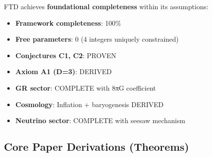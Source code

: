 \documentclass[
  11pt,
  letterpaper,
  twoside,
  openany]{book}
\makeatletter
\providecommand{\tightlist}{%
  \setlength{\itemsep}{0pt}\setlength{\parskip}{0pt}}
\let\orig@subsection\subsection
\renewcommand{\subsection}{\needspace{6\baselineskip}\orig@subsection}
\makeatother
\begin{document}
\begin{tcolorbox}[enhanced jigsaw, colbacktitle=quarto-callout-important-color!10!white, titlerule=0mm, bottomtitle=1mm, bottomrule=.15mm, colback=white, arc=.35mm, breakable, toprule=.15mm, title=\textcolor{quarto-callout-important-color}{\faExclamation}\hspace{0.5em}{Foundational Completeness Status}, rightrule=.15mm, coltitle=black, leftrule=.75mm, colframe=quarto-callout-important-color-frame, toptitle=1mm, opacityback=0, opacitybacktitle=0.6, left=2mm]

FTD achieves \textbf{foundational completeness} within its assumptions:

\begin{itemize}
\tightlist
\item
  \textbf{Framework completeness}: 100\%
\item
  \textbf{Free parameters}: 0 (4 integers uniquely constrained)
\item
  \textbf{Conjectures C1, C2}: PROVEN
\item
  \textbf{Axiom A1 (D=3)}: DERIVED
\item
  \textbf{GR sector}: COMPLETE with 8πG coefficient
\item
  \textbf{Cosmology}: Inflation + baryogenesis DERIVED
\item
  \textbf{Neutrino sector}: COMPLETE with seesaw mechanism
\end{itemize}

\end{tcolorbox}

\subsection{Core Paper Derivations
(Theorems)}\label{core-paper-derivations-theorems}
\end{document}
